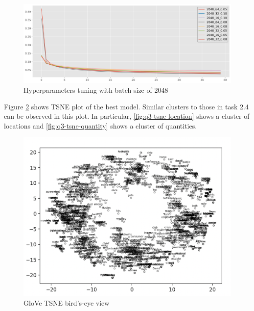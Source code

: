 \documentclass[12pt,article]{article}
\begin{document}
\begin{figure}[H]
    \centering
    \includegraphics[scale=0.5]{glove_tuning_2048.png} \par
    \caption{Hyperparameters tuning with batch size of 2048}
    \label{fig:q3-hyperparameters-b2048}
\end{figure}

\newpage

Figure \ref{fig:q3-tsne-overview} shows TSNE plot of the best model. Similar clusters to those in task 2.4 can be observed in this plot. In particular, \ref{fig:q3-tsne-location} shows a cluster of locations and \ref{fig:q3-tsne-quantity} shows a cluster of quantities.

\begin{figure}[H]
    \centering
    \includegraphics[scale=0.5]{glove_tsne_birdview.png} \par
    \caption{GloVe TSNE bird's-eye view}
    \label{fig:q3-tsne-overview}
\end{figure}
\end{document}
